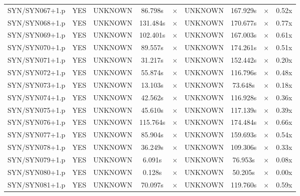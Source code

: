\documentclass[a4paper,10pt]{article}
\begin{document}
\begin{longtable}{lcccccccc}
SYN/SYN067+1.p & YES & UNKNOWN & 86.798s & \cellcolor{mismatchcolor}$\times$ & UNKNOWN & 167.929s & \cellcolor{mismatchcolor}$\times$ & 0.52x \\
SYN/SYN068+1.p & YES & UNKNOWN & 131.484s & \cellcolor{mismatchcolor}$\times$ & UNKNOWN & 170.677s & \cellcolor{mismatchcolor}$\times$ & 0.77x \\
SYN/SYN069+1.p & YES & UNKNOWN & 102.401s & \cellcolor{mismatchcolor}$\times$ & UNKNOWN & 167.003s & \cellcolor{mismatchcolor}$\times$ & 0.61x \\
SYN/SYN070+1.p & YES & UNKNOWN & 89.557s & \cellcolor{mismatchcolor}$\times$ & UNKNOWN & 174.261s & \cellcolor{mismatchcolor}$\times$ & 0.51x \\
SYN/SYN071+1.p & YES & UNKNOWN & 31.217s & \cellcolor{mismatchcolor}$\times$ & UNKNOWN & 152.442s & \cellcolor{mismatchcolor}$\times$ & 0.20x \\
SYN/SYN072+1.p & YES & UNKNOWN & 55.874s & \cellcolor{mismatchcolor}$\times$ & UNKNOWN & 116.796s & \cellcolor{mismatchcolor}$\times$ & 0.48x \\
SYN/SYN073+1.p & YES & UNKNOWN & 13.103s & \cellcolor{mismatchcolor}$\times$ & UNKNOWN & 73.648s & \cellcolor{mismatchcolor}$\times$ & 0.18x \\
SYN/SYN074+1.p & YES & UNKNOWN & 42.562s & \cellcolor{mismatchcolor}$\times$ & UNKNOWN & 116.928s & \cellcolor{mismatchcolor}$\times$ & 0.36x \\
SYN/SYN075+1.p & YES & UNKNOWN & 45.610s & \cellcolor{mismatchcolor}$\times$ & UNKNOWN & 117.139s & \cellcolor{mismatchcolor}$\times$ & 0.39x \\
SYN/SYN076+1.p & YES & UNKNOWN & 115.764s & \cellcolor{mismatchcolor}$\times$ & UNKNOWN & 174.484s & \cellcolor{mismatchcolor}$\times$ & 0.66x \\
SYN/SYN077+1.p & YES & UNKNOWN & 85.904s & \cellcolor{mismatchcolor}$\times$ & UNKNOWN & 159.693s & \cellcolor{mismatchcolor}$\times$ & 0.54x \\
SYN/SYN078+1.p & YES & UNKNOWN & 36.249s & \cellcolor{mismatchcolor}$\times$ & UNKNOWN & 109.306s & \cellcolor{mismatchcolor}$\times$ & 0.33x \\
SYN/SYN079+1.p & YES & UNKNOWN & 6.091s & \cellcolor{mismatchcolor}$\times$ & UNKNOWN & 76.953s & \cellcolor{mismatchcolor}$\times$ & 0.08x \\
SYN/SYN080+1.p & YES & UNKNOWN & 0.128s & \cellcolor{mismatchcolor}$\times$ & UNKNOWN & 50.205s & \cellcolor{mismatchcolor}$\times$ & 0.00x \\
SYN/SYN081+1.p & YES & UNKNOWN & 70.097s & \cellcolor{mismatchcolor}$\times$ & UNKNOWN & 119.760s & \cellcolor{mismatchcolor}$\times$ & 0.59x \\

\end{longtable}
\end{document}

